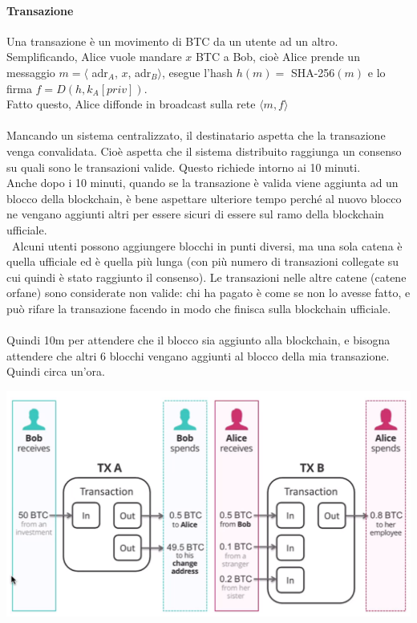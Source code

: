 \documentclass[10pt]{book}
\begin{document}
\paragraph{Transazione} Una transazione è un movimento di BTC da un utente ad un altro.\\
Semplificando, Alice vuole mandare $x$ BTC a Bob, cioè Alice prende un messaggio $m = \langle$ adr$_A$, $x$, adr$_B\rangle$, esegue l'hash $h(m) =$ SHA-256$(m)$ e lo firma $f = D(h, k_A[priv])$.\\
Fatto questo, Alice diffonde in broadcast sulla rete $\langle m,f\rangle$\\\\
Mancando un sistema centralizzato, il destinatario aspetta che la transazione venga convalidata. Cioè aspetta che il sistema distribuito raggiunga un consenso su quali sono le transazioni valide. Questo richiede intorno ai 10 minuti.\\
Anche dopo i 10 minuti, quando se la transazione è valida viene aggiunta ad un blocco della blockchain, è bene aspettare ulteriore tempo perché al nuovo blocco ne vengano aggiunti altri per essere sicuri di essere sul ramo della blockchain ufficiale.\\\
Alcuni utenti possono aggiungere blocchi in punti diversi, ma una sola catena è quella ufficiale ed è quella più lunga (con più numero di transazioni collegate su cui quindi è stato raggiunto il consenso). Le transazioni nelle altre catene (catene orfane) sono considerate non valide: chi ha pagato è come se non lo avesse fatto, e può rifare la transazione facendo in modo che finisca sulla blockchain ufficiale.\\\\
Quindi 10m per attendere che il blocco sia aggiunto alla blockchain, e bisogna attendere che altri 6 blocchi vengano aggiunti al blocco della mia transazione. Quindi circa un'ora.
\begin{center}
	\includegraphics[scale=0.5]{23.png}
\end{center}
\end{document}
